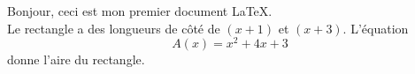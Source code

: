 \documentclass[11pt]{article}
\begin{document}
Bonjour, ceci est mon premier document \LaTeX{}.\\
Le rectangle a des longueurs de côté de $(x+1)$ et $(x+3)$.
L'équation $$A(x)=x^2+4x+3$$ donne l'aire du rectangle.
\end{document}
